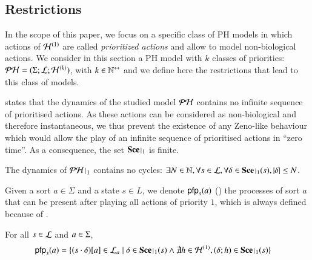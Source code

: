 \subsection{Restrictions}
\label{ssec:hypothesis}

In the scope of this paper, we focus on a specific class of PH models
in which actions of $\mathcal{H}^{(1)}$ are called \emph{prioritized actions} and allow to model non-biological actions.
We consider in this section a PH model with $k$ classes of priorities: $\mathcal{PH} = (\Sigma; \mathcal{L}; \mathcal{H}^{\langle k \rangle})$, with $k \in \mathbb{N}^{**}$
and we define here the restrictions that lead to this class of models.

 states that the dynamics of the studied model $\mathcal{PH}$ contains no infinite sequence of prioritised actions.
As these actions can be considered as non-biological and therefore instantaneous, we thus prevent the existence of any Zeno-like behaviour
which would allow the play of an infinite sequence of prioritised actions in “zero time”.
As a consequence, the set $\restriction{\Sce}{1}$ is finite.
%
\begin{condition}
\label{cr:bounded}
  The dynamics of $\restriction{\PH}{1}$ contains no cycles:
  $\exists N \in \sN, \forall s \in \PHl, \forall \delta \in \restriction{\Sce}{1}(s), |\delta| \leq N$.
\end{condition}

Given a sort $a\in\Sigma$ and a state $s\in L$, 
we denote $\mathsf{pfp}_s(a)$ () the processes of sort $a$ that can be present after
playing all actions of priority $1$,
which is always defined because of .

\begin{definition}[$\pfp : \PHl \times \PHs \rightarrow \powerset(\PHproc)$]
\label{def:pfp}
  For all $s \in \mathcal{L}$ and $a \in \Sigma$,
  \begin{align*}
    \pfp_s(a) = \{ \get{(s\play\delta)}{a} \in \PHl_a &\mid \delta \in \restriction{\Sce}{1}(s)
					\wedge\nexists h\in\PHh^{(1)}, (\delta; h) \in\restriction{\Sce}{1}(s) \}
  \end{align*}
\end{definition}

